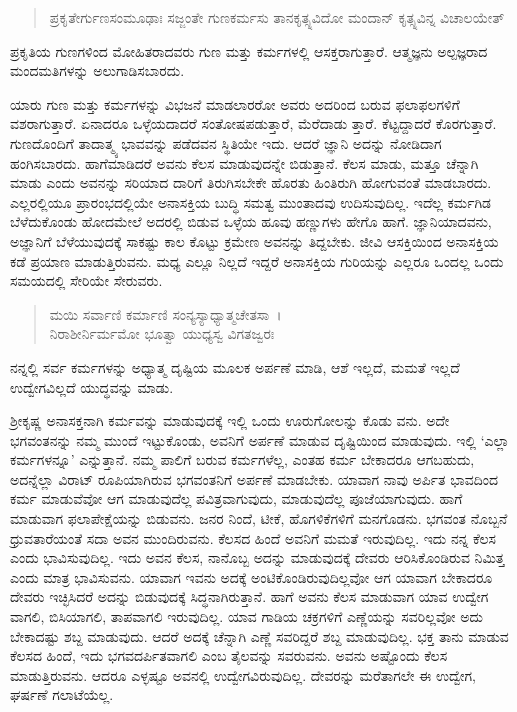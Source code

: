 \begin{verse}
ಪ್ರಕೃತೇರ್ಗುಣಸಂಮೂಢಾಃ ಸಜ್ಜಂತೇ ಗುಣಕರ್ಮಸು ತಾನಕೃತ್ಸ್ನವಿದೋ ಮಂದಾನ್ ಕೃತ್ಸ್ನವಿನ್ನ ವಿಚಾಲಯೇತ್ 
\end{verse}

{\small ಪ್ರಕೃತಿಯ ಗುಣಗಳಿಂದ ಮೋಹಿತರಾದವರು ಗುಣ ಮತ್ತು ಕರ್ಮಗಳಲ್ಲಿ ಆಸಕ್ತರಾಗುತ್ತಾರೆ. ಆತ್ಮಜ್ಞನು ಅಲ್ಪಜ್ಞರಾದ ಮಂದಮತಿಗಳನ್ನು ಅಲುಗಾಡಿಸಬಾರದು.}

ಯಾರು ಗುಣ ಮತ್ತು ಕರ್ಮಗಳನ್ನು ವಿಭಜನೆ ಮಾಡಲಾರರೋ ಅವರು ಅದರಿಂದ ಬರುವ ಫಲಾಫಲಗಳಿಗೆ ವಶರಾಗುತ್ತಾರೆ. ಏನಾದರೂ ಒಳ್ಳೆಯದಾದರೆ ಸಂತೋಷಪಡುತ್ತಾರೆ, ಮೆರೆದಾಡು ತ್ತಾರೆ. ಕೆಟ್ಟದ್ದಾದರೆ ಕೊರಗುತ್ತಾರೆ. ಗುಣದೊಂದಿಗೆ ತಾದಾತ್ಮ್ಯ ಭಾವವನ್ನು ಪಡೆದವನ ಸ್ಥಿತಿಯೇ ಇದು. ಆದರೆ ಜ್ಞಾನಿ ಅದನ್ನು ನೋಡಿದಾಗ ಹಂಗಿಸಬಾರದು. ಹಾಗೆಮಾಡಿದರೆ ಅವನು ಕೆಲಸ ಮಾಡುವುದನ್ನೇ ಬಿಡುತ್ತಾನೆ. ಕೆಲಸ ಮಾಡು, ಮತ್ತೂ ಚೆನ್ನಾಗಿ ಮಾಡು ಎಂದು ಅವನನ್ನು ಸರಿಯಾದ ದಾರಿಗೆ ತಿರುಗಿಸಬೇಕೇ ಹೊರತು ಹಿಂತಿರುಗಿ ಹೋಗುವಂತೆ ಮಾಡಬಾರದು. ಎಲ್ಲರಲ್ಲಿಯೂ ಪ್ರಾರಂಭದಲ್ಲಿಯೇ ಅನಾಸಕ್ತಿಯ ಬುದ್ಧಿ ಸಮತ್ವ ಮುಂತಾದವು ಉದಿಸುವುದಿಲ್ಲ. ಇದೆಲ್ಲ ಕರ್ಮಗಿಡ ಬೆಳೆದುಕೊಂಡು ಹೋದಮೇಲೆ ಅದರಲ್ಲಿ ಬಿಡುವ ಒಳ್ಳೆಯ ಹೂವು ಹಣ್ಣುಗಳು ಹೇಗೊ ಹಾಗೆ. ಜ್ಞಾನಿಯಾದವನು, ಅಜ್ಞಾನಿಗೆ ಬೆಳೆಯುವುದಕ್ಕೆ ಸಾಕಷ್ಟು ಕಾಲ ಕೊಟ್ಟು ಕ್ರಮೇಣ ಅವನನ್ನು ತಿದ್ದಬೇಕು. ಜೀವಿ ಆಸಕ್ತಿಯಿಂದ ಅನಾಸಕ್ತಿಯ ಕಡೆ ಪ್ರಯಾಣ ಮಾಡುತ್ತಿರುವನು. ಮಧ್ಯ ಎಲ್ಲೂ ನಿಲ್ಲದೆ ಇದ್ದರೆ ಅನಾಸಕ್ತಿಯ ಗುರಿಯನ್ನು ಎಲ್ಲರೂ ಒಂದಲ್ಲ ಒಂದು ಸಮಯದಲ್ಲಿ ಸೇರಿಯೇ ಸೇರುವರು.

\begin{verse}
ಮಯಿ ಸರ್ವಾಣಿ ಕರ್ಮಾಣಿ ಸಂನ್ಯಸ್ಯಾಧ್ಯಾತ್ಮಚೇತಸಾ~।\\ನಿರಾಶೀರ್ನಿರ್ಮಮೋ ಭೂತ್ವಾ ಯುಧ್ಯಸ್ವ ವಿಗತಜ್ವರಃ 
\end{verse}

{\small ನನ್ನಲ್ಲಿ ಸರ್ವ ಕರ್ಮಗಳನ್ನು ಅಧ್ಯಾತ್ಮ ದೃಷ್ಟಿಯ ಮೂಲಕ ಅರ್ಪಣೆ ಮಾಡಿ, ಆಶೆ ಇಲ್ಲದೆ, ಮಮತೆ ಇಲ್ಲದೆ ಉದ್ವೇಗವಿಲ್ಲದೆ ಯುದ್ಧವನ್ನು ಮಾಡು.}

ಶ‍್ರೀಕೃಷ್ಣ ಅನಾಸಕ್ತನಾಗಿ ಕರ್ಮವನ್ನು ಮಾಡುವುದಕ್ಕೆ ಇಲ್ಲಿ ಒಂದು ಊರುಗೋಲನ್ನು ಕೊಡು ವನು. ಅದೇ ಭಗವಂತನನ್ನು ನಮ್ಮ ಮುಂದೆ ಇಟ್ಟುಕೊಂಡು, ಅವನಿಗೆ ಅರ್ಪಣೆ ಮಾಡುವ ದೃಷ್ಟಿಯಿಂದ ಮಾಡುವುದು. ಇಲ್ಲಿ ‘ಎಲ್ಲಾ ಕರ್ಮಗಳನ್ನೂ’ ಎನ್ನುತ್ತಾನೆ. ನಮ್ಮ ಪಾಲಿಗೆ ಬರುವ ಕರ್ಮಗಳೆಲ್ಲ, ಎಂತಹ ಕರ್ಮ ಬೇಕಾದರೂ ಆಗಬಹುದು, ಅದನ್ನೆಲ್ಲಾ ವಿರಾಟ್ ರೂಪಿಯಾಗಿರುವ ಭಗವಂತನಿಗೆ ಅರ್ಪಣೆ ಮಾಡಬೇಕು. ಯಾವಾಗ ನಾವು ಅರ್ಪಿತ ಭಾವದಿಂದ ಕರ್ಮ ಮಾಡುವೆವೋ ಆಗ ಮಾಡುವುದೆಲ್ಲ ಪವಿತ್ರವಾಗುವುದು, ಮಾಡುವುದೆಲ್ಲ ಪೂಜೆಯಾಗುವುದು. ಹಾಗೆ ಮಾಡುವಾಗ ಫಲಾಪೇಕ್ಷೆಯನ್ನು ಬಿಡುವನು. ಜನರ ನಿಂದೆ, ಟೀಕೆ, ಹೊಗಳಿಕೆಗಳಿಗೆ ಮನಗೊಡನು. ಭಗವಂತ ನೊಬ್ಬನೆ ಧ್ರುವತಾರೆಯಂತೆ ಸದಾ ಅವನ ಮುಂದಿರುವನು. ಕೆಲಸದ ಹಿಂದೆ ಅವನಿಗೆ ಮಮತೆ ಇರುವುದಿಲ್ಲ. ಇದು ನನ್ನ ಕೆಲಸ ಎಂದು ಭಾವಿಸುವುದಿಲ್ಲ. ಇದು ಅವನ ಕೆಲಸ, ನಾನೊಬ್ಬ ಅದನ್ನು ಮಾಡುವುದಕ್ಕೆ ದೇವರು ಆರಿಸಿಕೊಂಡಿರುವ ನಿಮಿತ್ತ ಎಂದು ಮಾತ್ರ ಭಾವಿಸುವನು. ಯಾವಾಗ ಇವನು ಅದಕ್ಕೆ ಅಂಟಿಕೊಂಡಿರುವುದಿಲ್ಲವೋ ಆಗ ಯಾವಾಗ ಬೇಕಾದರೂ ದೇವರು ಇಚ್ಛಿಸಿದರೆ ಅದನ್ನು ಬಿಡುವುದಕ್ಕೆ ಸಿದ್ಧನಾಗಿರುತ್ತಾನೆ. ಹಾಗೆ ಅವನು ಕೆಲಸ ಮಾಡುವಾಗ ಯಾವ ಉದ್ವೇಗ ವಾಗಲಿ, ಬಿಸಿಯಾಗಲಿ, ತಾಪವಾಗಲಿ ಇರುವುದಿಲ್ಲ. ಯಾವ ಗಾಡಿಯ ಚಕ್ರಗಳಿಗೆ ಎಣ್ಣೆಯನ್ನು ಸವರಿಲ್ಲವೋ ಅದು ಬೇಕಾದಷ್ಟು ಶಬ್ದ ಮಾಡುವುದು. ಆದರೆ ಅದಕ್ಕೆ ಚೆನ್ನಾಗಿ ಎಣ್ಣೆ ಸವರಿದ್ದರೆ ಶಬ್ದ ಮಾಡುವುದಿಲ್ಲ. ಭಕ್ತ ತಾನು ಮಾಡುವ ಕೆಲಸದ ಹಿಂದೆ, ಇದು ಭಗವದರ್ಪಿತವಾಗಲಿ ಎಂಬ ತೈಲವನ್ನು ಸವರುವನು. ಅವನು ಅಷ್ಟೊಂದು ಕೆಲಸ ಮಾಡುತ್ತಿರುವನು. ಆದರೂ ಎಳ್ಳಷ್ಟೂ ಅವನಲ್ಲಿ ಉದ್ವೇಗವಿರುವುದಿಲ್ಲ. ದೇವರನ್ನು ಮರೆತಾಗಲೇ ಈ ಉದ್ವೇಗ, ಘರ್ಷಣೆ ಗಲಾಟೆಯೆಲ್ಲ.

